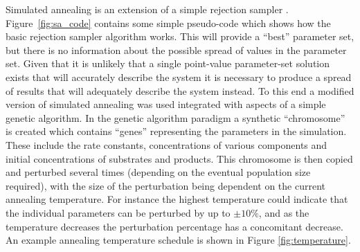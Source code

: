 Simulated annealing is an extension of a simple rejection sampler \cite{Marjoram2003}. Figure~\ref{fig:sa_code} contains some simple pseudo-code which shows how the basic rejection sampler algorithm works. This will provide a ``best'' parameter set, but there is no information about the possible spread of values in the parameter set. Given that it is unlikely that a single point-value parameter-set solution exists that will accurately describe the system it is necessary to produce a spread of results that will adequately describe the system instead. To this end a modified version of simulated annealing was used integrated with aspects of a simple genetic algorithm. In the genetic algorithm paradigm a synthetic ``chromosome'' is created which contains ``genes'' representing the parameters in the simulation. These include the rate constants, concentrations of various components and initial concentrations of substrates and products. This chromosome is then copied and perturbed several times (depending on the eventual population size required), with the size of the perturbation being dependent on the current annealing temperature. For instance the highest temperature could indicate that the individual parameters can be perturbed by up to $\pm 10\%$, and as the temperature decreases the perturbation percentage has a concomitant decrease. An example annealing temperature schedule is shown in Figure \ref{fig:temperature}.
